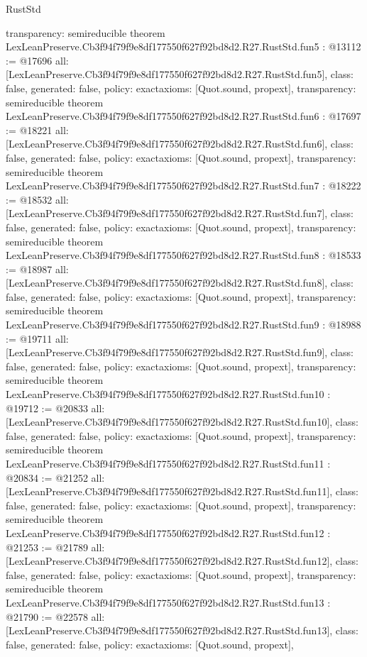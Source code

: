 \begin{lexlean}{RustStd}
\begin{coremodule}
{  transparency: semireducible
}
theorem LexLeanPreserve.Cb3f94f79f9e8df177550f627f92bd8d2.R27.RustStd.fun5 : @13112 := @17696 {
  all: [LexLeanPreserve.Cb3f94f79f9e8df177550f627f92bd8d2.R27.RustStd.fun5],
  class: false,
  generated: false,
  policy: exact{axioms: [Quot.sound, propext]},
  transparency: semireducible
}
theorem LexLeanPreserve.Cb3f94f79f9e8df177550f627f92bd8d2.R27.RustStd.fun6 : @17697 := @18221 {
  all: [LexLeanPreserve.Cb3f94f79f9e8df177550f627f92bd8d2.R27.RustStd.fun6],
  class: false,
  generated: false,
  policy: exact{axioms: [Quot.sound, propext]},
  transparency: semireducible
}
theorem LexLeanPreserve.Cb3f94f79f9e8df177550f627f92bd8d2.R27.RustStd.fun7 : @18222 := @18532 {
  all: [LexLeanPreserve.Cb3f94f79f9e8df177550f627f92bd8d2.R27.RustStd.fun7],
  class: false,
  generated: false,
  policy: exact{axioms: [Quot.sound, propext]},
  transparency: semireducible
}
theorem LexLeanPreserve.Cb3f94f79f9e8df177550f627f92bd8d2.R27.RustStd.fun8 : @18533 := @18987 {
  all: [LexLeanPreserve.Cb3f94f79f9e8df177550f627f92bd8d2.R27.RustStd.fun8],
  class: false,
  generated: false,
  policy: exact{axioms: [Quot.sound, propext]},
  transparency: semireducible
}
theorem LexLeanPreserve.Cb3f94f79f9e8df177550f627f92bd8d2.R27.RustStd.fun9 : @18988 := @19711 {
  all: [LexLeanPreserve.Cb3f94f79f9e8df177550f627f92bd8d2.R27.RustStd.fun9],
  class: false,
  generated: false,
  policy: exact{axioms: [Quot.sound, propext]},
  transparency: semireducible
}
theorem LexLeanPreserve.Cb3f94f79f9e8df177550f627f92bd8d2.R27.RustStd.fun10 : @19712 := @20833 {
  all: [LexLeanPreserve.Cb3f94f79f9e8df177550f627f92bd8d2.R27.RustStd.fun10],
  class: false,
  generated: false,
  policy: exact{axioms: [Quot.sound, propext]},
  transparency: semireducible
}
theorem LexLeanPreserve.Cb3f94f79f9e8df177550f627f92bd8d2.R27.RustStd.fun11 : @20834 := @21252 {
  all: [LexLeanPreserve.Cb3f94f79f9e8df177550f627f92bd8d2.R27.RustStd.fun11],
  class: false,
  generated: false,
  policy: exact{axioms: [Quot.sound, propext]},
  transparency: semireducible
}
theorem LexLeanPreserve.Cb3f94f79f9e8df177550f627f92bd8d2.R27.RustStd.fun12 : @21253 := @21789 {
  all: [LexLeanPreserve.Cb3f94f79f9e8df177550f627f92bd8d2.R27.RustStd.fun12],
  class: false,
  generated: false,
  policy: exact{axioms: [Quot.sound, propext]},
  transparency: semireducible
}
theorem LexLeanPreserve.Cb3f94f79f9e8df177550f627f92bd8d2.R27.RustStd.fun13 : @21790 := @22578 {
  all: [LexLeanPreserve.Cb3f94f79f9e8df177550f627f92bd8d2.R27.RustStd.fun13],
  class: false,
  generated: false,
  policy: exact{axioms: [Quot.sound, propext]},
}
\end{coremodule}
\end{lexlean}
